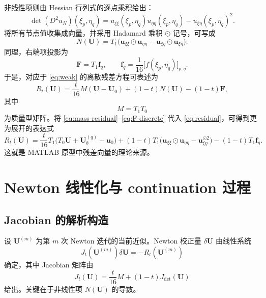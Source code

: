 \documentclass[11pt,a4paper]{article}
\begin{document}
非线性项则由 Hessian 行列式的逐点乘积给出：
\begin{equation}
\det(D^2u_N)(\xi_p,\eta_q)
=
u_{\xi\xi}(\xi_p,\eta_q)u_{\eta\eta}(\xi_p,\eta_q)-u_{\xi\eta}(\xi_p,\eta_q)^2.
\label{eq:det-pointwise}
\end{equation}
将所有节点值收集成向量，并采用 Hadamard 乘积 $\odot$ 记号，可写成
\begin{equation}
N(\bm U)
=
T_1\bigl(\bm u_{\xi\xi}\odot\bm u_{\eta\eta}-\bm u_{\xi\eta}\odot\bm u_{\xi\eta}\bigr).
\label{eq:nonlinear-discrete}
\end{equation}
同理，右端项投影为
\begin{equation}
\bm F=T_1\bm f_q,
\qquad
\bm f_q=\frac{1}{16}\bigl[f(\xi_p,\eta_q)\bigr]_{p,q}.
\label{eq:F-discrete}
\end{equation}
于是，对应于 \eqref{eq:weak} 的离散残差方程可表述为
\begin{equation}
R_t(\bm U)
=
\frac{t}{16}M(\bm U-\bm U_0)+(1-t)N(\bm U)-(1-t)\bm F,
\label{eq:residual}
\end{equation}
其中
\begin{equation}
M=T_1T_0
\label{eq:mass-matrix}
\end{equation}
为质量型矩阵。将 \eqref{eq:mass-residual}--\eqref{eq:F-discrete} 代入 \eqref{eq:residual}，可得到更为展开的表达式
\begin{equation}
R_t(\bm U)
=
\frac{t}{16}T_1\bigl(T_0\bm U+\bm U_b^{(q)}-\bm u_0\bigr)
+(1-t)T_1\bigl(\bm u_{\xi\xi}\odot\bm u_{\eta\eta}-\bm u_{\xi\eta}^{\odot 2}\bigr)
-(1-t)T_1\bm f_q.
\label{eq:residual-expanded}
\end{equation}
这就是 MATLAB 原型中残差向量的理论来源。

\section{Newton 线性化与 continuation 过程}
\subsection{Jacobian 的解析构造}
设 $\bm U^{(m)}$ 为第 $m$ 次 Newton 迭代的当前近似。Newton 校正量 $\delta\bm U$ 由线性系统
\begin{equation}
J_t(\bm U^{(m)})\delta\bm U=-R_t(\bm U^{(m)})
\label{eq:newton}
\end{equation}
确定，其中 Jacobian 矩阵由
\begin{equation}
J_t(\bm U)=\frac{t}{16}M+(1-t)J_{\det}(\bm U)
\label{eq:jac}
\end{equation}
给出。关键在于非线性项 $N(\bm U)$ 的导数。
\end{document}
